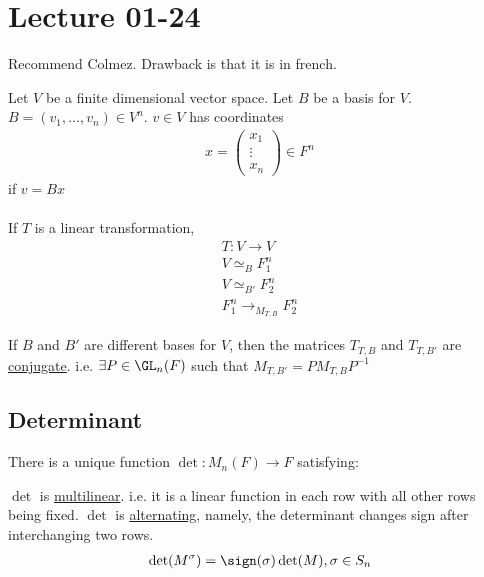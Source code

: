 \documentclass[class=scrartcl, crop=false]{standalone}
\date{2020-01-24}
\begin{document}
\section{Lecture 01-24}

Recommend Colmez. Drawback is that it is in french.

Let $V$ be a finite dimensional vector space. Let $B$ be a basis for $V$. $B = (v_1, \dots, v_n) \in V^n$. $v \in V$ has coordinates  
\begin{gather*}
  x = 
  \begin{pmatrix}
    x_1 \\
    \vdots \\
    x_n
  \end{pmatrix} \in F^n
\end{gather*} if $v = Bx$ 
\\\\
If $T$ is a linear transformation,
\begin{gather*}
  T: V \to V \\
  V \simeq_B F^n_1 \\
  V \simeq_{B'} F^n_2 \\
  F^n_1 \to_{M_{T, B}} F^n_2
\end{gather*} %

\begin{fact}
  If $B$ and $B'$ are different bases for $V$, then the matrices $T_{T, B}$ and $T_{T, B'}$ are \ul{conjugate}. i.e. $\exists P \in \GL_n(F)$ such that $M_{T, B'} = PM_{T, B}P^{-1}$
\end{fact} 

\subsection{Determinant}

\begin{proposition}
  There is a unique function $\det: M_n(F) \to F$ satisfying:
  \begin{enumerate}
    \ii
    $\det$ is \ul{multilinear}. i.e. it is a linear function in each row with all other rows being fixed.
    \ii
    $\det$ is \ul{alternating}, namely, the determinant changes sign after interchanging two rows.
    \begin{gather*}
      \det(M^\sigma) = \sign(\sigma)\det(M), \sigma \in S_n
    \end{gather*} 
  \end{enumerate} 
\end{proposition} 
\end{document}
